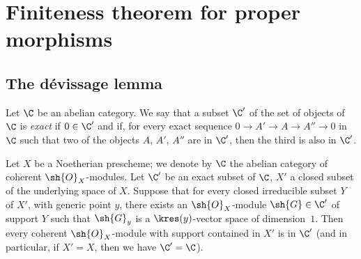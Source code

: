 \section{Finiteness theorem for proper morphisms}
\label{section:III.3}

\subsection{The d\'evissage lemma}
\label{subsection:III.3.1}

\begin{definition}[3.1.1]
\label{III.3.1.1}
Let $\C$ be an abelian category.
We say that a subset $\C'$ of the set of objects of $\C$ is \emph{exact} if $0\in\C'$ and if, for every exact sequence $0\to A'\to A\to A''\to 0$ in $\C$ such that two of the objects $A$, $A'$, $A''$ are in $\C'$, then the third is also in $\C'$.
\end{definition}

\begin{theorem}[3.1.2]
\label{III.3.1.2}
Let $X$ be a Noetherian prescheme; we denote by $\C$ the abelian category of coherent $\sh{O}_X$-modules.
Let $\C'$ be an exact subset of $\C$, $X'$ a closed subset of the underlying space of $X$.
Suppose that for every closed irreducible subset $Y$ of $X'$, with generic point $y$, there exists an $\sh{O}_X$-module $\sh{G}\in\C'$ of support $Y$ such that $\sh{G}_y$ is a $\kres(y)$-vector space of dimension~$1$.
Then every coherent $\sh{O}_X$-module with support contained in $X'$ is in $\C'$ (and in particular, if $X'=X$, then we have $\C'=\C$).
\end{theorem}

